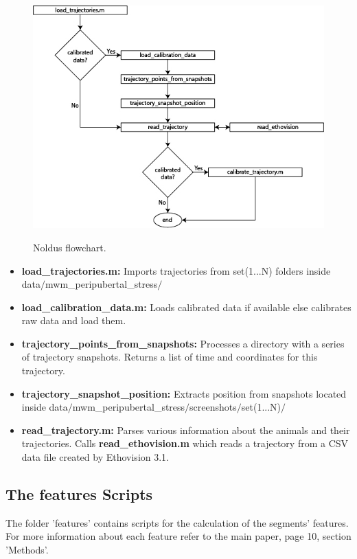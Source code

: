 \documentclass[12pt,titlepage]{article}
\begin{document}
\begin{doublespace}
\begin{figure}[H]
	\begin{center}
		\includegraphics[width=1\textwidth]{noldus.jpg}\\
		\caption [noldus]{Noldus flowchart.}\label{noldus}
	\end{center}
\end{figure}

\begin{itemize}
	\item\textbf{load\_trajectories.m:}
	 Imports trajectories from set(1...N) folders inside\\ data$/$mwm\_peripubertal\_stress$/$
	\item\textbf{load\_calibration\_data.m:}
	 Loads calibrated data if available else calibrates raw data and load them.
	\item\textbf{trajectory\_points\_from\_snapshots:}
	 Processes a directory with a series of trajectory snapshots. Returns a list of time and coordinates for this trajectory.
	\item\textbf{trajectory\_snapshot\_position:}
	 Extracts position from snapshots located inside  data$/$mwm\_peripubertal\_stress$/$screenshots$/$set(1...N)$/$
	\item\textbf{read\_trajectory.m:}
	 Parses various information about the animals and their trajectories. Calls \textbf{read\_ethovision.m} which reads a trajectory from a CSV data file created by Ethovision 3.1.
\end{itemize}

\subsection{The features Scripts}
The folder 'features' contains scripts for the calculation of the segments' features. For more information about each feature refer to the main paper, page 10, section 'Methods'.


\end{doublespace}
\end{document}

